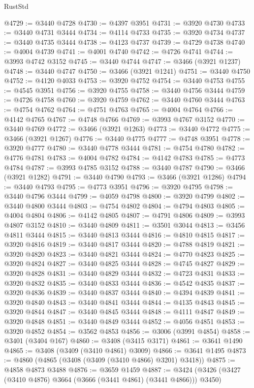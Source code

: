\begin{lexlean}{RustStd}
\begin{coremodule}
@4729 := @3440 @4728
@4730 := @4397 @3951
@4731 := @3920 @4730
@4733 := @3440 @4731 @3444
@4734 := @4114 @4733
@4735 := @3920 @4734
@4737 := @3440 @4735 @3444
@4738 := @4123 @4737
@4739 := @4729 @4738
@4740 := @4004 @4739
@4741 := @4001 @4740
@4742 := @4726 @4741
@4744 := @3993 @4742 @3152
@4745 := @3440 @4744
@4747 := @3466 (@3921 @1237)
@4748 := @3440 @4747
@4750 := @3466 (@3921 @1241)
@4751 := @3440 @4750
@4752 := @4120 @4033
@4753 := @3920 @4752
@4754 := @3440 @4753
@4755 := @4545 @3951
@4756 := @3920 @4755
@4758 := @3440 @4756 @3444
@4759 := @4726 @4758
@4760 := @3920 @4759
@4762 := @3440 @4760 @3444
@4763 := @4754 @4762
@4764 := @4751 @4763
@4765 := @4004 @4764
@4766 := @4142 @4765
@4767 := @4748 @4766
@4769 := @3993 @4767 @3152
@4770 := @3440 @4769
@4772 := @3466 (@3921 @1263)
@4773 := @3440 @4772
@4775 := @3466 (@3921 @1267)
@4776 := @3440 @4775
@4777 := @4748 @3951
@4778 := @3920 @4777
@4780 := @3440 @4778 @3444
@4781 := @4754 @4780
@4782 := @4776 @4781
@4783 := @4004 @4782
@4784 := @4142 @4783
@4785 := @4773 @4784
@4787 := @3993 @4785 @3152
@4788 := @3440 @4787
@4790 := @3466 (@3921 @1282)
@4791 := @3440 @4790
@4793 := @3466 (@3921 @1286)
@4794 := @3440 @4793
@4795 := @4773 @3951
@4796 := @3920 @4795
@4798 := @3440 @4796 @3444
@4799 := @4059 @4798
@4800 := @3920 @4799
@4802 := @3440 @4800 @3444
@4803 := @4754 @4802
@4804 := @4794 @4803
@4805 := @4004 @4804
@4806 := @4142 @4805
@4807 := @4791 @4806
@4809 := @3993 @4807 @3152
@4810 := @3440 @4809
@4811 := @3501 @3044
@4813 := @3456 @4811 @3444
@4815 := @3440 @4813 @3444
@4816 := @4810 @4815
@4817 := @3920 @4816
@4819 := @3440 @4817 @3444
@4820 := @4788 @4819
@4821 := @3920 @4820
@4823 := @3440 @4821 @3444
@4824 := @4770 @4823
@4825 := @3920 @4824
@4827 := @3440 @4825 @3444
@4828 := @4745 @4827
@4829 := @3920 @4828
@4831 := @3440 @4829 @3444
@4832 := @4723 @4831
@4833 := @3920 @4832
@4835 := @3440 @4833 @3444
@4836 := @4542 @4835
@4837 := @3920 @4836
@4839 := @3440 @4837 @3444
@4840 := @4394 @4839
@4841 := @3920 @4840
@4843 := @3440 @4841 @3444
@4844 := @4135 @4843
@4845 := @3920 @4844
@4847 := @3440 @4845 @3444
@4848 := @4111 @4847
@4849 := @3920 @4848
@4851 := @3440 @4849 @3444
@4852 := @4056 @4851
@4853 := @3920 @4852
@4854 := @3562 @4853
@4856 := @3006 (@3991 @4854)
@4858 := @3401 (@3404 @167)
@4860 := @3408 (@3415 @3171)
@4861 := @3641 @1490
@4865 := @3408 (@3409 (@3410 @4861) @3009)
@4866 := @3641 @1495
@4873 := @4860 (@4865 (@3408 (@3409 (@3410 @4866) @3201) @3418))
@4875 := @4858 @4873 @3488
@4876 := @3659 @1459
@4887 := @3424 (@3426 (@3427 (@3410 @4876) @3664 (@3666 (@3441 @4861) (@3441 @4866))) @3450)

\end{coremodule}
\end{lexlean}
